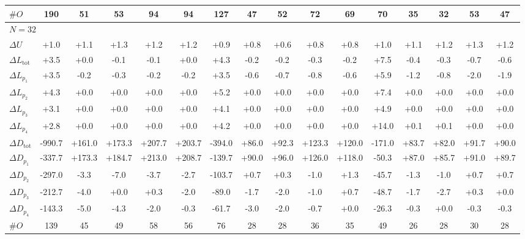 \begin{tabular}{l c c c c c c c c c c c c c c c}
$\#O$ & 190 & 51 & 53 & 94 & 94 & 127 & 47 & 52 & 72 & 69 & 70 & 35 & 32 & 53 & 47 \\
\midrule
\multicolumn{16}{l}{${N=32}$} \\
\midrule
$\Delta U$ & +1.0 & +1.1 & +1.3 & +1.2 & +1.2 & +0.9 & +0.8 & +0.6 & +0.8 & +0.8 & +1.0 & +1.1 & +1.2 & +1.3 & +1.2 \\
$\Delta L_{\mathrm{tot}}$ & +3.5 & +0.0 & -0.1 & -0.1 & +0.0 & +4.3 & -0.2 & -0.2 & -0.3 & -0.2 & +7.5 & -0.4 & -0.3 & -0.7 & -0.6 \\
$\Delta L_{p_1}$ & +3.5 & -0.2 & -0.3 & -0.2 & -0.2 & +3.5 & -0.6 & -0.7 & -0.8 & -0.6 & +5.9 & -1.2 & -0.8 & -2.0 & -1.9 \\
$\Delta L_{p_2}$ & +4.3 & +0.0 & +0.0 & +0.0 & +0.0 & +5.2 & +0.0 & +0.0 & +0.0 & +0.0 & +7.4 & +0.0 & +0.0 & +0.0 & +0.0 \\
$\Delta L_{p_3}$ & +3.1 & +0.0 & +0.0 & +0.0 & +0.0 & +4.1 & +0.0 & +0.0 & +0.0 & +0.0 & +4.9 & +0.0 & +0.0 & +0.0 & +0.0 \\
$\Delta L_{p_4}$ & +2.8 & +0.0 & +0.0 & +0.0 & +0.0 & +4.2 & +0.0 & +0.0 & +0.0 & +0.0 & +14.0 & +0.1 & +0.1 & +0.0 & +0.0 \\
$\Delta D_{\mathrm{tot}}$ & -990.7 & +161.0 & +173.3 & +207.7 & +203.7 & -394.0 & +86.0 & +92.3 & +123.3 & +120.0 & -171.0 & +83.7 & +82.0 & +91.7 & +90.0 \\
$\Delta D_{p_1}$ & -337.7 & +173.3 & +184.7 & +213.0 & +208.7 & -139.7 & +90.0 & +96.0 & +126.0 & +118.0 & -50.3 & +87.0 & +85.7 & +91.0 & +89.7 \\
$\Delta D_{p_2}$ & -297.0 & -3.3 & -7.0 & -3.7 & -2.7 & -103.7 & +0.7 & +0.3 & -1.0 & +1.3 & -45.7 & -1.3 & -1.0 & +0.7 & +0.7 \\
$\Delta D_{p_3}$ & -212.7 & -4.0 & +0.0 & +0.3 & -2.0 & -89.0 & -1.7 & -2.0 & -1.0 & +0.7 & -48.7 & -1.7 & -2.7 & +0.3 & +0.0 \\
$\Delta D_{p_4}$ & -143.3 & -5.0 & -4.3 & -2.0 & -0.3 & -61.7 & -3.0 & -2.0 & -0.7 & +0.0 & -26.3 & -0.3 & +0.0 & -0.3 & -0.3 \\
$\#O$ & 139 & 45 & 49 & 58 & 56 & 76 & 28 & 28 & 36 & 35 & 49 & 26 & 28 & 30 & 28 \\
\bottomrule
\end{tabular}
